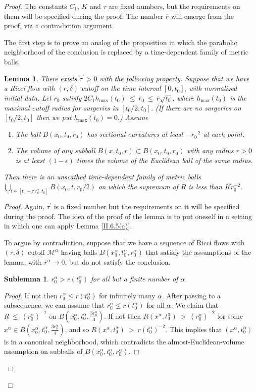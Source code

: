 \documentclass[12pt]{amsart}
\newcommand{\al}{\alpha}
\newcommand{\M}{{\mathcal M}}
\numberwithin{equation}{section}
\theoremstyle{plain}
\newtheorem{lemma}[equation]{Lemma}
\newtheorem{sublemma}[equation]{Sublemma}
\theoremstyle{definition}
\theoremstyle{remark}
\begin{document}
\begin{proof}
The constants $C_1$, $K$ and $\tau$ are fixed numbers, but the
requirements on them will
be specified during the proof. The number $\overline{r}$ will emerge
from the proof, via a contradiction argument.

The first step is to prove an analog of the proposition in which
the parabolic neighborhood of the conclusion is replaced by 
a time-dependent family of metric balls.

\begin{lemma} \label{extra}
There exists $\tau^\prime > 0$
with the
following property. Suppose that we have a Ricci flow with $(r, \delta)$-cutoff
on the time interval $[0, t_0]$, with normalized initial data.  Let 
$r_0$ satisfy
$2C_1 h_{\max}(t_0) \: \le \: r_0 \: \le \: \overline{r} \sqrt{t_0}$,
where $h_{\max}(t_0)$ is the maximal cutoff radius for surgeries in 
$[t_0/2, t_0]$. (If there are no surgeries on $[t_0/2, t_0]$ then we put
$h_{\max}(t_0) = 0$.)
Assume 
\begin{enumerate}
\item The ball $B(x_0, t_0, r_0)$ has sectional curvatures at least $- r_0^{-2}$
at each point.
\item The volume of any subball $B(x, t_0, r) \subset B(x_0, t_0, r_0)$ with
any radius $r > 0$ is at least $(1-\epsilon)$ times the volume of the
Euclidean ball of the same radius.
\end{enumerate}

Then there is an unscathed time-dependent family
of metric balls 
$\bigcup_{t \in [t_0-\tau^\prime r_0^2, t_0]} B(x_0, t, r_0/2)$ 
on which the supremum of $R$ is less than $K r_0^{-2}$.
\end{lemma}
\begin{proof}
Again, $\tau^\prime$ is a fixed number but the
requirements on it will
be specified during the proof. 
The idea of the proof of the lemma
is to put oneself in a setting in
which one can apply Lemma \ref{II.6.5(a)}.

To argue by contradiction,
suppose that we have a sequence of 
Ricci flows with $(r, \delta)$-cutoff $\M^\alpha$ having
balls $B(x_0^\al, t_0^\al, r_0^\al)$ that
satisfy the assumptions of the lemma, with $\overline{r}^\alpha
\rightarrow 0$, but do not satisfy the conclusion.

\begin{sublemma}
$r_0^\al > r(t_0^\al)$ for all but a finite number of $\al$.
\end{sublemma}
\begin{proof}
If not then $r_0^\al \le r(t_0^\al)$ for 
infinitely many
$\al$. After passing to a subsequence, we can assume
that $r_0^\al \le r(t_0^\al)$ for all $\al$. We  claim that
$R \: \le \: (r_0^\al)^{-2}$ on $B(x_0^\al, t_0^\al, \frac{3r_0^\al}{4})$.
If not then $R(x^\al, t_0^\al) \: > \: (r_0^\al)^{-2}$ for some
$x^\al \in B(x_0^\al, t_0^\al, \frac{3r_0^\al}{4})$, and so
$R(x^\al, t_0^\al) \: > \: r(t_0^\al)^{-2}$.
This implies that 
$(x^\al, t_0^\al)$ is in a canonical neighborhood, which
contradicts the almost-Euclidean-volume assumption on subballs of
$B(x_0^\al, t_0^\al, r_0^\al)$.


\end{proof}
\end{proof}
\end{proof}
\end{document}
